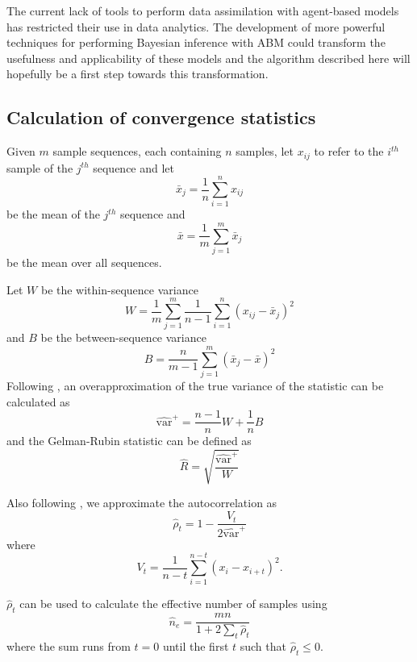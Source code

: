 \documentclass{article}
\begin{document}
The current lack of tools to perform data assimilation with agent-based models has restricted their use in data analytics. The development of more powerful techniques for performing Bayesian inference with ABM could transform the usefulness and applicability of these models and the algorithm described here will hopefully be a first step towards this transformation.

\begin{appendices} 

\section{Calculation of convergence statistics}
\label{calculatingConvergenceStats}
Given $m$ sample sequences, each containing $n$ samples, let $x_{ij}$ to refer to the $i^{th}$ sample of the $j^{th}$ sequence and let
\[
\bar{x}_j = \frac{1}{n}\sum_{i=1}^n x_{ij}
\]
be the mean of the $j^{th}$ sequence and
\[
\bar{x} = \frac{1}{m}\sum_{j=1}^m \bar{x}_j
\]
be the mean over all sequences.

Let $W$ be the within-sequence variance
\[
W = \frac{1}{m} \sum_{j=1}^m \frac{1}{n-1} \sum_{i=1}^n (x_{ij} - \bar{x}_j)^2
\]
and $B$ be the between-sequence variance
\[
B = \frac{n}{m-1}\sum_{j=1}^m (\bar{x}_j - \bar{x})^2
\]
Following \citet{gelman2013bayesian}, an overapproximation of the true variance of the statistic can be calculated as
\[
\widehat{\text{var}}^+ = \frac{n-1}{n}W + \frac{1}{n}B
\]
and the Gelman-Rubin statistic can be defined as
\[
\hat{R} = \sqrt{\frac{\widehat{\text{var}}^+}{W}}
\]

Also following \citet{gelman2013bayesian}, we approximate the autocorrelation as
\[
\hat{\rho}_t = 1 - \frac{V_t}{2\widehat{\text{var}}^+}
\]
where
\[
V_t = \frac{1}{n-t} \sum_{i=1}^{n-t} (x_i - x_{i+t})^2.
\]

$\hat{\rho}_t$ can be used to calculate the effective number of samples using
\[
\hat{n}_e = \frac{mn}{1 + 2\sum_{t} \hat{\rho}_t}
\]
where the sum runs from $t=0$ until the first $t$ such that $\hat{\rho}_t \le 0$.

\end{appendices}

%
% 


\end{document}
